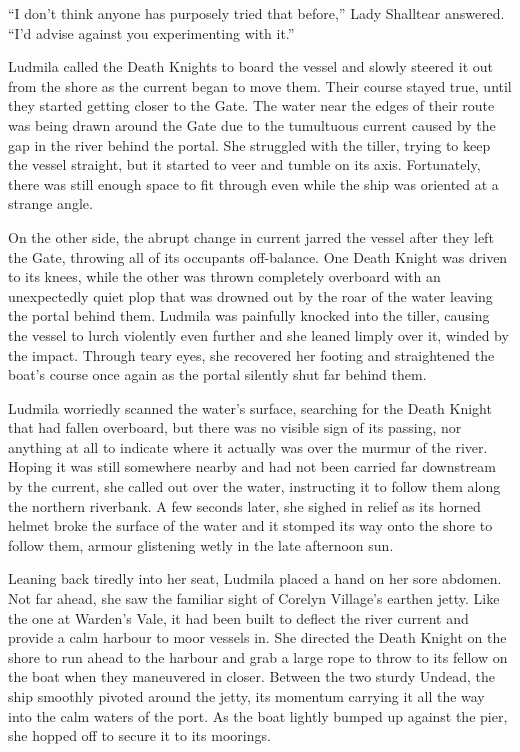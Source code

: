  

“I don’t think anyone has purposely tried that before,” Lady Shalltear answered. “I’d advise against you experimenting with it.”

 

Ludmila called the Death Knights to board the vessel and slowly steered it out from the shore as the current began to move them. Their course stayed true, until they started getting closer to the Gate. The water near the edges of their route was being drawn around the Gate due to the tumultuous current caused by the gap in the river behind the portal. She struggled with the tiller, trying to keep the vessel straight, but it started to veer and tumble on its axis. Fortunately, there was still enough space to fit through even while the ship was oriented at a strange angle.

 

On the other side, the abrupt change in current jarred the vessel after they left the Gate, throwing all of its occupants off-balance. One Death Knight was driven to its knees, while the other was thrown completely overboard with an unexpectedly quiet plop that was drowned out by the roar of the water leaving the portal behind them. Ludmila was painfully knocked into the tiller, causing the vessel to lurch violently even further and she leaned limply over it, winded by the impact. Through teary eyes, she recovered her footing and straightened the boat’s course once again as the portal silently shut far behind them.

 

Ludmila worriedly scanned the water’s surface, searching for the Death Knight that had fallen overboard, but there was no visible sign of its passing, nor anything at all to indicate where it actually was over the murmur of the river. Hoping it was still somewhere nearby and had not been carried far downstream by the current, she called out over the water, instructing it to follow them along the northern riverbank. A few seconds later, she sighed in relief as its horned helmet broke the surface of the water and it stomped its way onto the shore to follow them, armour glistening wetly in the late afternoon sun.

 

Leaning back tiredly into her seat, Ludmila placed a hand on her sore abdomen. Not far ahead, she saw the familiar sight of Corelyn Village’s earthen jetty. Like the one at Warden’s Vale, it had been built to deflect the river current and provide a calm harbour to moor vessels in. She directed the Death Knight on the shore to run ahead to the harbour and grab a large rope to throw to its fellow on the boat when they maneuvered in closer. Between the two sturdy Undead, the ship smoothly pivoted around the jetty, its momentum carrying it all the way into the calm waters of the port. As the boat lightly bumped up against the pier, she hopped off to secure it to its moorings.

